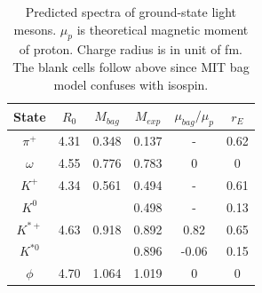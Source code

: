 \documentclass[prd,twocolumn,floatfix,nofootinbib]{revtex4}
\begin{document}
\renewcommand{\tabcolsep}{0.37cm}
\renewcommand{\arraystretch}{1.3}
\begin{table}[!htbp]
    \caption{Predicted spectra of ground-state light mesons. $\mu_{p}$ is theoretical magnetic moment of proton. Charge radius is in unit of fm.
    The blank cells follow above since MIT bag model confuses with isospin.}
    \label{tab:lightmeson}
    \begin{tabular}{cccccc}
        \hline\hline
        {\rm State}         &$R_{0}$    &$M_{bag}$  &$M_{exp}$  &$\mu_{bag}/\mu_{p}$    &$r_{E}$ \\ \hline
        $\pi^{+}$ 	        &4.31	    &0.348	    &0.137	    &-	                    &0.62 \\ 
        $\omega$ 	        &4.55	    &0.776	    &0.783	    &0                      &0 \\ 
        $K^{+}$ 	        &4.34	    &0.561	    &0.494	    &-                      &0.61 \\ 
        $K^{0}$ 		    &           &           &0.498	    &-	                    &0.13 \\ 
        $K^{\ast +}$ 	    &4.63	    &0.918	    &0.892	    &0.82                   &0.65 \\ 
        $K^{\ast 0}$ 	    &           &           &0.896	    &-0.06	                &0.15 \\ 
        $\phi$ 	            &4.70	    &1.064	    &1.019	    &0                      &0 \\ 
        \hline\hline
    \end{tabular}
\end{table}
\end{document}
